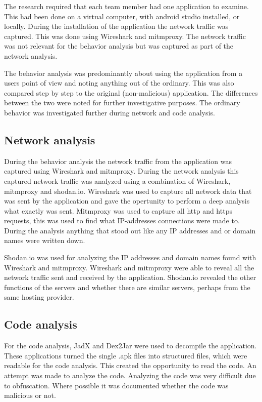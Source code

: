 The research required that each team member had one application to examine.
This had been done on a virtual computer, with android studio installed, or locally.
During the installation of the application the network traffic was captured.
This was done using Wireshark and mitmproxy.
The network traffic was not relevant for the behavior analysis but was captured as part of the network analysis.

The behavior analysis was predominantly about using the application from a users point of view and noting anything out of the ordinary.
This was also compared step by step to the original (non-malicious) application.
The differences between the two were noted for further investigative purposes.
The ordinary behavior was investigated further during network and code analysis.

\subsection{Network analysis}

During the behavior analysis the network traffic from the application was captured using Wireshark and mitmproxy.
During the network analysis this captured network traffic was analyzed using a combination of Wireshark, mitmproxy and shodan.io.
Wireshark was used to capture all network data that was sent by the application and gave the opertunity to perform a deep analysis what exactly was sent.
Mitmproxy was used to capture all http and https requests, this was used to find what IP-addresses connections were made to.
During the analysis anything that stood out like any IP addresses and or domain names were written down.

Shodan.io was used for analyzing the IP addresses and domain names found with Wireshark and mitmproxy.
Wireshark and mitmproxy were able to reveal all the network traffic sent and received by the application.
Shodan.io revealed the other functions of the servers and whether there are similar servers, perhaps from the same hosting provider.

\subsection{Code analysis}

For the code analysis, JadX and Dex2Jar were used to decompile the application.
These applications turned the single .apk files into structured files, which were readable for the code analysis.
This created the opportunity to read the code.
An attempt was made to analyze the code.
Analyzing the code was very difficult due to obfuscation.
Where possible it was documented whether the code was malicious or not.

